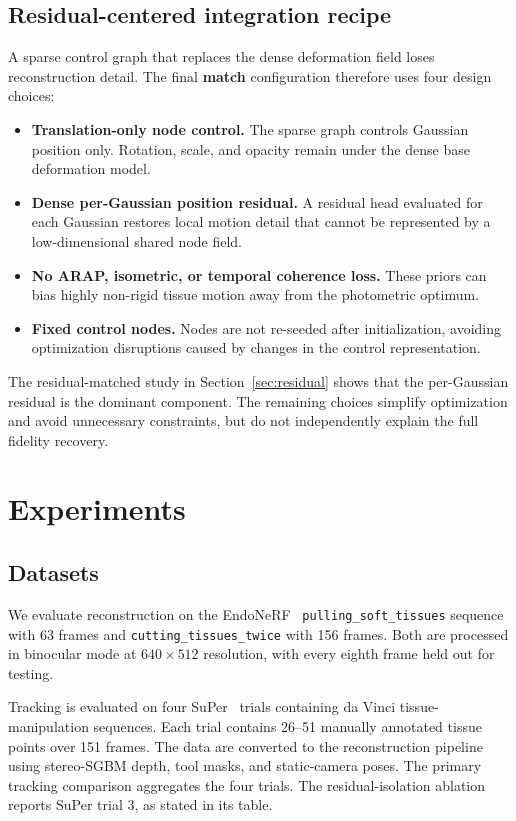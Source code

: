 \documentclass[AMA,Times1COL]{WileyNJDv5} %
\begin{document}
\subsection{Residual-centered integration recipe}

A sparse control graph that replaces the dense deformation field loses reconstruction detail. The final \textbf{match} configuration therefore uses four design choices:

\begin{itemize}
\item \textbf{Translation-only node control.} The sparse graph controls Gaussian position only. Rotation, scale, and opacity remain under the dense base deformation model.
\item \textbf{Dense per-Gaussian position residual.} A residual head evaluated for each Gaussian restores local motion detail that cannot be represented by a low-dimensional shared node field.
\item \textbf{No ARAP, isometric, or temporal coherence loss.} These priors can bias highly non-rigid tissue motion away from the photometric optimum.
\item \textbf{Fixed control nodes.} Nodes are not re-seeded after initialization, avoiding optimization disruptions caused by changes in the control representation.
\end{itemize}

The residual-matched study in Section~\ref{sec:residual} shows that the per-Gaussian residual is the dominant component. The remaining choices simplify optimization and avoid unnecessary constraints, but do not independently explain the full fidelity recovery.

\section{Experiments}\label{sec4}

\subsection{Datasets}

We evaluate reconstruction on the EndoNeRF~\cite{wang2022endonerf} \texttt{pulling\_soft\_tissues} sequence with 63 frames and \texttt{cutting\_tissues\_twice} with 156 frames. Both are processed in binocular mode at $640\times512$ resolution, with every eighth frame held out for testing.

Tracking is evaluated on four SuPer~\cite{li2020super} trials containing da Vinci tissue-manipulation sequences. Each trial contains 26--51 manually annotated tissue points over 151 frames. The data are converted to the reconstruction pipeline using stereo-SGBM depth, tool masks, and static-camera poses. The primary tracking comparison aggregates the four trials. The residual-isolation ablation reports SuPer trial 3, as stated in its table.
\end{document}

